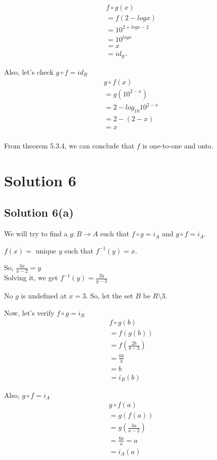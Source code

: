 \documentclass{article}
\begin{document}
\begin{align*}
  f \circ g(x) \\
  = f(2 - log x) \\
  = 10^{2 + log x - 2} \\
  = 10^{log x} \\
  = x \\
  = id_{\mathbb{R^{+}}}
\end{align*}

Also, let's check $g \circ f = id_R$
\begin{align*}
  g \circ f(x) \\
  = g(10^{2 - x}) \\
  = 2 - log_{10} 10^{2-x}\\
  = 2 - (2 - x) \\
  = x \\
\end{align*}

From theorem 5.3.4, we can conclude that $f$ is one-to-one and onto.

\section{Solution 6}
\subsection{Solution 6(a)}
We will try to find a $g: B \to A$ such that $f \circ g = i_A$ and $g
\circ f = i_A$.

$f(x) = $ unique $y$ such that $f^{-1}(y) = x$.

So, $\frac{3x}{x-2} = y$ \\
Solving it, we get $f^{-1}(y) = \frac{2y}{y-3}$

No $g$ is undefined at $x = 3$. So, let the set $B$ be $R \setminus {3}$.

Now, let's verify $f \circ g = i_B$
\begin{align*}
  f \circ g(b) \\
  = f(g(b)) \\
  = f(\frac{2b}{b-3}) \\
  = \frac{6b}{b} \\
  = b \\
  = i_B(b)
\end{align*}

Also, $g \circ f = i_A$
\begin{align*}
  g \circ f(a) \\
  = g(f(a)) \\
  = g(\frac{3a}{a-2}) \\
  = \frac{6a}{a}
  = a \\
  = i_A(a)
\end{align*}
\end{document}
